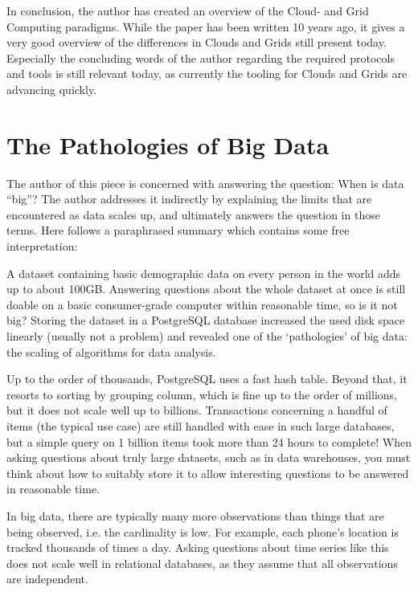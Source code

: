 \documentclass{article}
\begin{document}
In conclusion, the author has created an overview of the Cloud- and Grid
Computing paradigms. While the paper has been written 10 years ago, it gives a
very good overview of the differences in Clouds and Grids still present today.
Especially the concluding words of the author regarding the required protocols
and tools is still relevant today, as currently the tooling for Clouds and Grids
are advancing quickly.


\section*{The Pathologies of Big Data}
The author of this piece is concerned with answering the question: When is data
“big”? The author addresses it indirectly by explaining the limits that are 
encountered as data scales up, and ultimately answers the question in those 
terms. Here follows a paraphrased summary which contains some free 
interpretation:

A dataset containing basic demographic data on every person in the world adds 
up to about 100GB. Answering questions about the whole dataset at once is still
doable on a basic consumer-grade computer within reasonable time, so is it not 
big? Storing the dataset in a PostgreSQL database increased the used disk space
linearly (usually not a problem) and revealed one of the ‘pathologies’ of big 
data: the scaling of algorithms for data analysis. 

Up to the order of thousands, PostgreSQL uses a fast hash table. Beyond that, 
it resorts to sorting by grouping column, which is fine up to the order of 
millions, but it does not scale well up to billions. Transactions concerning a 
handful of items (the typical use case) are still handled with ease in such 
large databases, but a simple query on 1 billion items took more than 24 hours 
to complete! When asking questions about truly large datasets, such as in data 
warehouses, you must think about how to suitably store it to allow interesting 
questions to be answered in reasonable time.

In big data, there are typically many more observations than things that are 
being observed, i.e. the cardinality is low. For example, each phone’s 
location is tracked thousands of times a day. Asking questions about time 
series like this does not scale well in relational databases, as they assume 
that all observations are independent.
\end{document}
